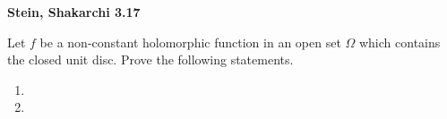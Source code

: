 \textbf{Stein, Shakarchi 3.17}

Let $f$ be a non-constant holomorphic function in an open set $\Omega$ which contains the closed unit disc. Prove the 
following statements.

\begin{enumerate}
  \item 
  \pagebreak
  \item 
\end{enumerate}